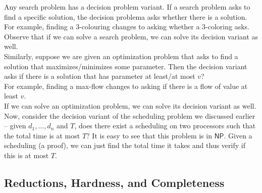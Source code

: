 	Any search problem has a decision problem variant. If a search problem asks to find a specific solution, the decision problema asks whether there is a solution.\\
	For example, finding a $3$-colouring changes to asking whether a $3$-coloring asks.\\
	Observe that if we can solve a search problem, we can solve its decision variant as well.\\

	Similarly, suppose we are given an optimization problem that asks to find a solution that maximizes/minimizes some parameter. Then the decision variant asks if there is a solution that has parameter at least/at most $v$?\\
	For example, finding a max-flow changes to asking if there is a flow of value at least $v$.\\
	If we can solve an optimization problem, we can solve its decision variant as well.\\

	Now, consider the decision variant of the scheduling problem we discussed earlier -- given $d_1,\ldots,d_n$ and $T$, does there exist a scheduling on two processors such that the total time is at most $T$? It is easy to see that this problem is in $\mathsf{NP}$. Given a scheduling (a proof), we can just find the total time it takes and thus verify if this is at most $T$.

\subsection{Reductions, Hardness, and Completeness}

